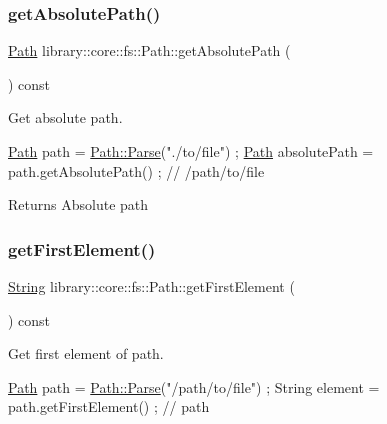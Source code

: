 \subsubsection{\texorpdfstring{get\+Absolute\+Path()}{getAbsolutePath()}}
{\footnotesize\ttfamily \hyperlink{classlibrary_1_1core_1_1fs_1_1_path}{Path} library\+::core\+::fs\+::\+Path\+::get\+Absolute\+Path (\begin{DoxyParamCaption}{ }\end{DoxyParamCaption}) const}



Get absolute path. 


\begin{DoxyCode}
\hyperlink{classlibrary_1_1core_1_1fs_1_1_path_aabc4240fc08479d1bff6b9753f2b5cc2}{Path} path = \hyperlink{classlibrary_1_1core_1_1fs_1_1_path_a6ba644b6609507e724c217bf2020f5ae}{Path::Parse}(\textcolor{stringliteral}{"./to/file"}) ;
\hyperlink{classlibrary_1_1core_1_1fs_1_1_path_aabc4240fc08479d1bff6b9753f2b5cc2}{Path} absolutePath = path.getAbsolutePath() ; \textcolor{comment}{// /path/to/file}
\end{DoxyCode}


\begin{DoxyReturn}{Returns}
Absolute path 
\end{DoxyReturn}
\mbox{\label{classlibrary_1_1core_1_1fs_1_1_path_a2d2c6d44f2a229948ea564d3ba8bc456}} 
\subsubsection{\texorpdfstring{get\+First\+Element()}{getFirstElement()}}
{\footnotesize\ttfamily \hyperlink{classlibrary_1_1core_1_1types_1_1_string}{String} library\+::core\+::fs\+::\+Path\+::get\+First\+Element (\begin{DoxyParamCaption}{ }\end{DoxyParamCaption}) const}



Get first element of path. 


\begin{DoxyCode}
\hyperlink{classlibrary_1_1core_1_1fs_1_1_path_aabc4240fc08479d1bff6b9753f2b5cc2}{Path} path = \hyperlink{classlibrary_1_1core_1_1fs_1_1_path_a6ba644b6609507e724c217bf2020f5ae}{Path::Parse}(\textcolor{stringliteral}{"/path/to/file"}) ;
String element = path.getFirstElement() ; \textcolor{comment}{// path}
\end{DoxyCode}


